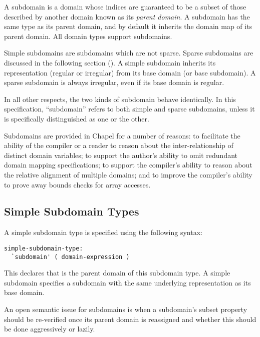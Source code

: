 A subdomain is a domain whose indices are guaranteed to be a subset of
those described by another domain known as its \emph{parent domain}.
A subdomain has the same type as its parent domain, and by default
it inherits the domain map of its parent domain.  All domain types
support subdomains.

Simple subdomains are subdomains which are not sparse.  Sparse
subdomains are discussed in the following section
().  A simple subdomain
inherits its representation (regular or irregular) from its base
domain (or base subdomain).  A sparse subdomain is always irregular,
even if its base domain is regular.

In all other respects, the two kinds of subdomain behave identically.  In this
specification, ``subdomain'' refers to both simple and sparse subdomains, unless
it is specifically distinguished as one or the other.

\begin{rationale}
Subdomains are provided in Chapel for a number of reasons: to
facilitate the ability of the compiler or a reader to reason about the
inter-relationship of distinct domain variables; to support the
author's ability to omit redundant domain mapping specifications; to
support the compiler's ability to reason about the relative alignment
of multiple domains; and to improve the compiler's ability to prove
away bounds checks for array accesses.
\end{rationale}

\subsection{Simple Subdomain Types}
\label{Simple_Subdomain_Types}

A simple subdomain type is specified using the following syntax:
\begin{syntax}
\begin{verbatim}
simple-subdomain-type:
  `subdomain' ( domain-expression )
\end{verbatim}
\end{syntax}

This declares that  is the parent domain of
this subdomain type.  A simple subdomain specifies a subdomain
with the same underlying representation as its base domain.  

\begin{openissue}

An open semantic issue for subdomains is when a subdomain's subset
property should be re-verified once its parent domain is reassigned
and whether this should be done aggressively or lazily.

\end{openissue}


